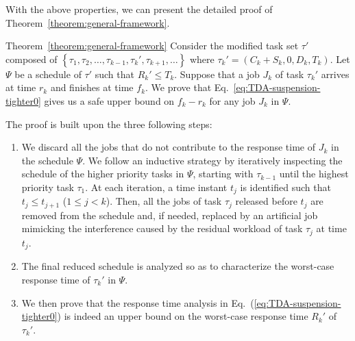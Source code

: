 With the above properties, we can present the detailed proof of
Theorem~\ref{theorem:general-framework}. 

\begin{appProof}{Theorem~\ref{theorem:general-framework}}
Consider the modified task set $\tau'$ composed of $\left\{\tau_1, \tau_2, \ldots, \tau_{k-1}, \tau_k', \tau_{k+1}, \ldots \right\}$ where $\tau_k' = (C_k + S_k, 0, D_k, T_k)$. Let $\Psi$ be a schedule of $\tau'$ such that $R_k' \leq T_k$.  
Suppose that a job $J_{k}$ of task $\tau_k'$ arrives at time $r_k$ and finishes at time $f_k$. We prove that Eq.~\eqref{eq:TDA-suspension-tighter0} gives us a safe upper bound on $f_k-r_k$ for any job $J_k$ in $\Psi$.


The proof is built upon the three following steps:
\begin{enumerate}
\item We discard all the jobs that do not contribute to the response time of $J_k$ in the schedule $\Psi$. We follow an inductive strategy by iteratively inspecting the schedule of the higher priority tasks in $\Psi$, starting with $\tau_{k-1}$ until the highest priority task $\tau_1$. At each iteration, a time instant $t_j$ is identified such that $t_j \leq t_{j+1}$ ($1 \leq j < k$). Then, all the jobs of task $\tau_j$ released before $t_j$ are removed from the schedule and, if needed, replaced by an artificial job mimicking the interference caused by the residual workload of task $\tau_j$ at time $t_j$. %
\item The final reduced schedule is analyzed so as to characterize the
  worst-case response time of $\tau_k'$ in $\Psi$. %
\item We then prove that the response time analysis in Eq.~(\ref{eq:TDA-suspension-tighter0}) is indeed an upper bound on the worst-case response time $R_k'$ of $\tau_k'$.
\end{enumerate}

  

\end{appProof}
